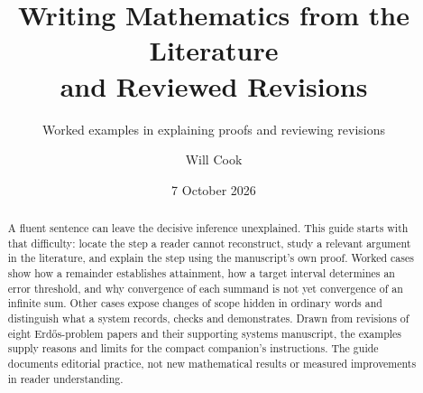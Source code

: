 \documentclass[11pt]{article}
\title{Writing Mathematics from the Literature\\and Reviewed Revisions}
\subtitle{Worked examples in explaining proofs and reviewing revisions}
\author{Will Cook}
\date{7 October 2026}
\begin{document}
\maketitle
\paperprovenance
\begin{abstract}
A fluent sentence can leave the decisive inference unexplained. This guide
starts with that difficulty: locate the step a reader cannot reconstruct,
study a relevant argument in the literature, and explain the step using the
manuscript's own proof. Worked cases show how a remainder establishes
attainment, how a target interval determines an error threshold, and why
convergence of each summand is not yet convergence of an infinite sum.
Other cases expose changes of scope hidden in ordinary words and distinguish
what a system records, checks and demonstrates. Drawn from revisions of eight
Erd\H{o}s-problem papers and their supporting systems manuscript, the examples
supply reasons and limits for the compact companion's instructions.
The guide documents editorial practice, not new mathematical results or
measured improvements in reader understanding.
\end{abstract}





\end{document}
